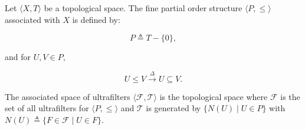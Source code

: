 Let $\langle X, T \rangle$ be a topological space. The fine partial order structure $\langle P, \leq \rangle$ associated with $X$ is defined by:

$$P \triangleq T - \{0\},$$

and for $U, V \in P$,

$$U \leq V \xrightarrow{\Delta} U \subseteq V.$$

The associated space of ultrafilters $\langle \mathcal{F}, \mathcal{T} \rangle$ is the topological space where $\mathcal{F}$ is the set of all ultrafilters for $\langle P, \leq \rangle$ and $\mathcal{T}$ is generated by $\{N(U) \mid U \in P\}$ with $N(U) \triangleq \{F \in \mathcal{F} \mid U \in F\}$.

